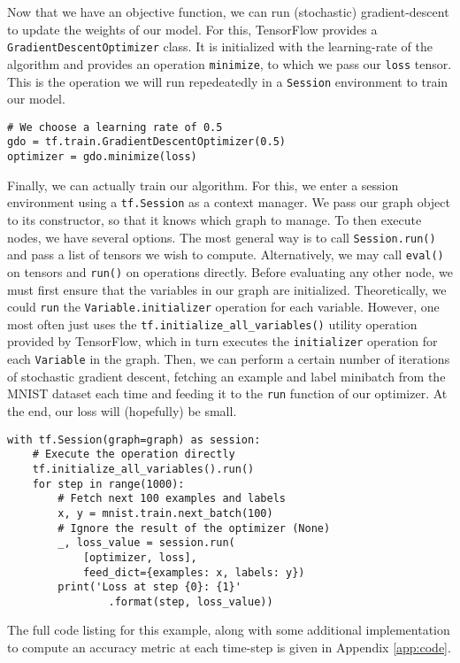 Now that we have an objective function, we can run (stochastic) gradient-descent
to update the weights of our model. For this, TensorFlow provides a
\texttt{GradientDescentOptimizer} class. It is initialized with the
learning-rate of the algorithm and provides an operation \texttt{minimize}, to
which we pass our \texttt{loss} tensor. This is the operation we will run
repedeatedly in a \texttt{Session} environment to train our model.

\begin{lstlisting}
# We choose a learning rate of 0.5
gdo = tf.train.GradientDescentOptimizer(0.5)
optimizer = gdo.minimize(loss)
\end{lstlisting}

Finally, we can actually train our algorithm. For this, we enter a session
environment using a \texttt{tf.Session} as a context manager. We pass our graph
object to its constructor, so that it knows which graph to manage. To then
execute nodes, we have several options. The most general way is to call
\texttt{Session.run()} and pass a list of tensors we wish to
compute. Alternatively, we may call \texttt{eval()} on tensors and
\texttt{run()} on operations directly. Before evaluating any other node, we must
first ensure that the variables in our graph are initialized. Theoretically, we
could \texttt{run} the \texttt{Variable.initializer} operation for each
variable. However, one most often just uses the
\texttt{tf.initialize\_all\_variables()} utility operation provided by
TensorFlow, which in turn executes the \texttt{initializer} operation for each
\texttt{Variable} in the graph. Then, we can perform a certain number of
iterations of stochastic gradient descent, fetching an example and label
minibatch from the MNIST dataset each time and feeding it to the \texttt{run}
function of our optimizer. At the end, our loss will (hopefully) be small.

\begin{lstlisting}
with tf.Session(graph=graph) as session:
    # Execute the operation directly
    tf.initialize_all_variables().run()
    for step in range(1000):
        # Fetch next 100 examples and labels
        x, y = mnist.train.next_batch(100)
        # Ignore the result of the optimizer (None)
        _, loss_value = session.run(
            [optimizer, loss],
            feed_dict={examples: x, labels: y})
        print('Loss at step {0}: {1}'
                .format(step, loss_value))
\end{lstlisting}

The full code listing for this example, along with some additional
implementation to compute an accuracy metric at each time-step is given in
Appendix \ref{app:code}.

